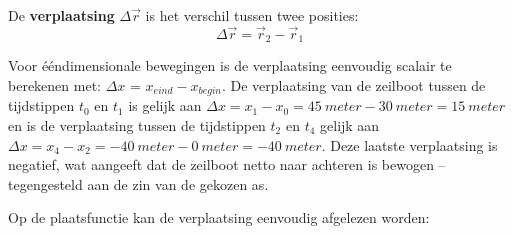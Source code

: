 \documentclass{ximera}
\begin{document}
\begin{definition}
De \textbf{verplaatsing} \(\Delta \vec{r}\) is het verschil tussen twee posities:
\[
\Delta \vec{r} = \vec{r}_2 - \vec{r}_1
\]


\begin{image}[0.3\textwidth]
\end{image}
\end{definition}





Voor ééndimensionale bewegingen is de verplaatsing eenvoudig scalair te berekenen met: $\Delta x$ = $x_{eind}-x_{begin}$.
De verplaatsing van de zeilboot tussen de tijdstippen $t_0$ en $t_1$ is gelijk aan \( \Delta x = x_1-x_0 = \SI{45}{meter} - \SI{30}{meter} = \SI{15}{meter}\)  en is de verplaatsing tussen de tijdstippen $t_2$ en $t_4$ gelijk aan \(\Delta x=x_4-x_2=\SI{-40}{meter} - \SI{0}{meter} = \SI{-40}{meter}\). Deze laatste verplaatsing is negatief, wat aangeeft dat de zeilboot netto naar achteren is bewogen -- tegengesteld aan de zin van de gekozen as.

Op de plaatsfunctie kan de verplaatsing eenvoudig afgelezen worden: 
\end{document}
